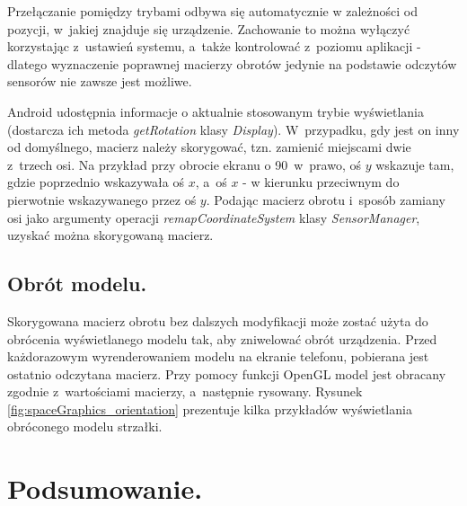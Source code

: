 \documentclass[a4paper,twocolumn,11pt]{article}
\begin{document}
 Przełączanie pomiędzy trybami odbywa się automatycznie w zależności od pozycji, w~jakiej znajduje się urządzenie.
 Zachowanie to można wyłączyć korzystając z~ustawień systemu, a~także kontrolować z~poziomu aplikacji - dlatego wyznaczenie poprawnej macierzy obrotów jedynie na podstawie odczytów sensorów nie zawsze jest możliwe.
 
 Android udostępnia informacje o aktualnie stosowanym trybie wyświetlania (dostarcza ich metoda \emph{getRotation} klasy \emph{Display}).
 W~przypadku, gdy jest on inny od domyślnego, macierz należy skorygować, tzn. zamienić miejscami dwie z~trzech osi.
 Na przykład przy obrocie ekranu o 90\textdegree~w~prawo, oś $y$ wskazuje tam, gdzie poprzednio wskazywała oś $x$, a~oś $x$ - w kierunku przeciwnym do pierwotnie wskazywanego przez oś $y$.
 Podając macierz obrotu i~sposób zamiany osi jako argumenty operacji \emph{remapCoordinateSystem} klasy \emph{SensorManager}, uzyskać można skorygowaną macierz.


\subsection{Obrót modelu.}
 Skorygowana macierz obrotu bez dalszych modyfikacji może zostać użyta do obrócenia wyświetlanego modelu tak, aby zniwelować obrót urządzenia.
 Przed każdorazowym wyrenderowaniem modelu na ekranie telefonu, pobierana jest ostatnio odczytana macierz.
 Przy pomocy funkcji OpenGL model jest obracany zgodnie z~wartościami macierzy, a~następnie rysowany.
 Rysunek \ref{fig:spaceGraphics_orientation} prezentuje kilka przykładów wyświetlania obróconego modelu strzałki.
 
 




\section{Podsumowanie.} \label{sec:summary}



\end{document}
